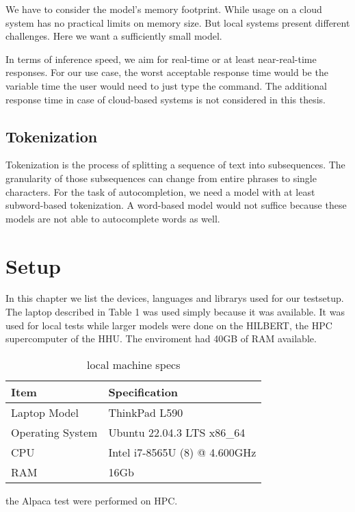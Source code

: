 We have to consider the model's memory footprint. While usage on a cloud system has no practical limits on memory size. But local systems present different challenges.
Here we want a sufficiently small model.

In terms of inference speed, we aim for real-time or at least near-real-time responses. For our use case, the worst acceptable response time would be the variable time the user would need to just type the command. The additional response time in case of cloud-based systems is not considered in this thesis.


\subsection{Tokenization}

Tokenization is the process of splitting a sequence of text into subsequences. The granularity of those subsequences can change from entire phrases to single characters.
For the task of autocompletion, we need a model with at least subword-based tokenization. A word-based model would not suffice because these models are not able to autocomplete words as well. 






\section{Setup}\raggedbottom
In this chapter we list the devices, languages and librarys used for our testsetup.
The laptop described in Table 1 was used simply because it was available. It was used for local tests while larger models were done on the HILBERT, the HPC supercomputer of the HHU. The enviroment had 40GB of RAM available.


\begin{table}[h]
\centering
\begin{tabular}{|l|l|}
\hline
\textbf{Item} & \textbf{Specification} \\
\hline
Laptop Model & ThinkPad L590 \\
\hline
Operating System & Ubuntu 22.04.3 LTS x86\_64 \\
\hline
CPU & Intel i7-8565U (8) @ 4.600GHz \\
\hline
RAM & 16Gb \\
\hline
\end{tabular}
\caption{local machine specs }
\end{table}

the Alpaca test were performed on HPC.

